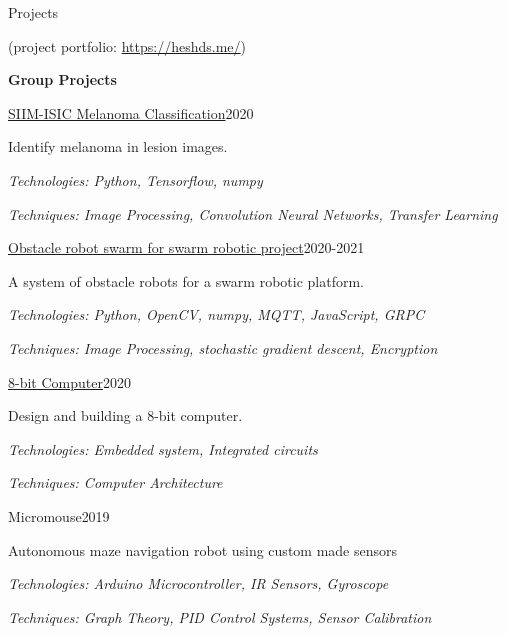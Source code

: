 \documentclass{resume} %
\begin{document}
\begin{rSection}{Projects}

(project portfolio: \href{https://heshds.me/}{https://heshds.me/})

\textbf{Group Projects}\\

\begin{rSubsection}{\href{https://github.com/HeshanDissanayake/SIIM_ISIC_melanoma_classification}{SIIM-ISIC Melanoma Classification}}{2020}{}{}
\item Identify melanoma in lesion images. \item 
\textit{Technologies: Python, Tensorflow, numpy}
\item \textit{Techniques: Image Processing, Convolution Neural Networks, Transfer Learning }
\end{rSubsection}

\begin{rSubsection}{\href{https://github.com/dtdinidu7/e16-3yp-obstacle-bots-for-swarm-robots}{Obstacle robot swarm for swarm robotic project}}{2020-2021}{}{}
\item A system of obstacle robots for a swarm robotic platform. \item 
\textit{Technologies: Python, OpenCV, numpy, MQTT, JavaScript, GRPC}
\item \textit{Techniques: Image Processing, stochastic gradient descent, Encryption }
\end{rSubsection}

\begin{rSubsection}{\href{https://github.com/HeshanDissanayake/8-bit-computer}{8-bit Computer}}{2020}{}{}
\item Design and building a 8-bit computer. \item 
\textit{Technologies: Embedded system, Integrated circuits}
\item \textit{Techniques: Computer Architecture }
\end{rSubsection}

\begin{rSubsection}{Micromouse}{2019}{}{}
\item Autonomous maze navigation robot using custom made sensors 
\item \textit{Technologies: Arduino Microcontroller, IR Sensors, Gyroscope} 
\item \textit{Techniques: Graph Theory, PID Control Systems, Sensor Calibration}
\end{rSubsection}


\end{rSection}
\end{document}
